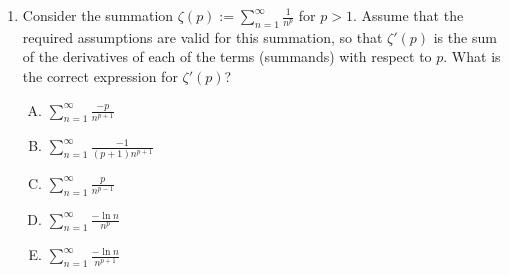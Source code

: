 \documentclass[10pt]{amsart}
\begin{document}
\begin{enumerate}
  {\em Explanation}: When $|x| < 1$, then the series is absolutely
  convergent and when $|x| > 1$ it diverges, as we can see by the root
  test or ratio test. What's happening is that $(1/n^p)^{1/n} \to 1$
  (regardless of $p$), so the radius of convergence is $1$.

  This leaves the case $|x| = 1$. If $x = 1$, then we get the usual
  $p$-series, which we know converges iff $p > 1$. If $x = -1$, then
  the terms have alternating signs. Obviously, the series cannot
  converge for $p \le 0$ because the terms do not tend to $0$. For $p
  > 0$, on the other hand, the terms are alternating in sign and
  decrease monotonically, tending to $0$. Thus, by the alternating
  series theorem, it converges for $p > 0$.

  {\em Performance review}: $3$ out of $11$ got this. $4$ chose (C),
  $2$ each chose (B) and (D).

  {\em Historical note (last year)}: $7$ out of $26$ people got this
  correct. $10$ chose (C), $4$ chose (D), $3$ chose (A), $2$ chose
  (B). The large vote for (C) indicates that many people did not
  notice the special application of the alternating series theorem to
  the case of $x = -1$.

  {\em Action point}: Please review what happens in the case $x =
  -1$. This will be covered in more detail in class when we study the
  notion of interval of convergence of a power series.

  There is a result of calculus which states that, under suitable
  conditions, if $f_1, f_2, \dots, f_n, \dots$ are all functions, and
  we define $f(x) := \sum_{n=1}^\infty f_n(x)$, then $f'(x) =
  \sum_{n=1}^\infty f_n'(x)$. In other words, under suitable
  assumptions, we can differentiate a sum of countably many functions
  by differentiating each of them and adding up the derivatives.

  We will not be going into what those assumptions are, but will
  consider some applications where you are explicitly told that these
  assumptions are satisfied.


\item Consider the summation $\zeta(p) := \sum_{n=1}^\infty
  \frac{1}{n^p}$ for $p > 1$. Assume that the required assumptions are
  valid for this summation, so that $\zeta'(p)$ is the sum of the
  derivatives of each of the terms (summands) with respect to
  $p$. What is the correct expression for $\zeta'(p)$?
  
  \begin{enumerate}[(A)]
  \item $\sum_{n=1}^\infty \frac{-p}{n^{p+1}}$
  \item $\sum_{n=1}^\infty \frac{-1}{(p+1)n^{p+1}}$
  \item $\sum_{n=1}^\infty \frac{p}{n^{p-1}}$
  \item $\sum_{n=1}^\infty \frac{-\ln n}{n^p}$
  \item $\sum_{n=1}^\infty \frac{-\ln n}{n^{p+1}}$
  \end{enumerate}


\end{enumerate}
\end{document}
